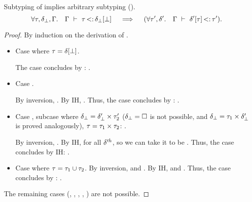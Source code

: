 \begin{lemma}{Subtyping of \tybot implies arbitrary subtyping
    (\textbf{}).}\label{lem:sub-of-bot:app}
    \[
    \forall \tau, \delta_{\bot}, \Gamma.\quad 
    \Gamma\ \vdash\ \tau \operatorname{<:} \delta_{\bot}[\bot]
    \quad\implies\quad
    (\forall \tau', \delta'.\quad \Gamma\ \vdash\ \delta'[\tau] \operatorname{<:} \tau').
    \]
\end{lemma}
\begin{proof}
    By induction on the derivation of 
    \subtydflt{\ty}{\plug{\dctx_{\tybot}}\tybot}.
    \begin{itemize}
        \item Case 
            \subtydflt{\plug\dctx\tybot}{\plug{\dctx_{\tybot}}{\tybot}}
            where $\tau = \delta[\bot]$.

            The case concludes by :
            . 
        \item Case 
            \subtydflt{\plug\dctx\vany}{\plug{\dctx_{\tybot}}{\tybot}}.

            By inversion, \subtydflt{\plug\dctx\tyub}{\plug{\dctx_{\tybot}}{\tybot}}.
            By IH, .
            Thus, the case concludes by : 
            .
        \item Case , subcase where
            $\delta_{\bot} = \delta'_{\bot} \times \tau'_2$
            ($\delta_{\bot} = \square$ is not possible, and
            $\delta_{\bot} = \tau_1 \times \delta'_{\bot}$
            is proved analogously),
            $\tau = \tau_1 \times \tau_2$:
            {}.

            By inversion, .
            By IH,  for all $\delta'^h$,
            so we can take it to be .
            Thus, the case concludes by IH: 
            .
        \item Case 
            where $\tau = \tau_1 \cup \tau_2$.
            By inversion, 
             and
            .
            By IH,  and
            .
            Thus, the case concludes by : 
            .
    \end{itemize}
    The remaining cases 
    (, , , , ) 
    are not possible.
\end{proof}

